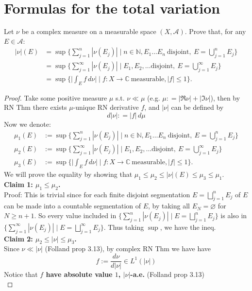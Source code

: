 \documentclass[lang=cn,11pt]{elegantbook}
\begin{document}
\section{Formulas for the total variation}
  Let $\nu$ be a complex measure on a measurable space $(X,\mathcal{A})$. Prove that, for any $E\in\mathcal{A}$:   \begin{align*}
    |\nu|(E)
    &=\sup\{\sum_{j=1}^n|\nu(E_j)|\mid n\in\mathbb{N}, E_1\dots E_n\ \text{disjoint},\ E=\bigcup_{j=1}^nE_j\}\\
    &=\sup\{\sum_{j=1}^\infty|\nu(E_j)|\mid E_1, E_2,\dots \text{disjoint},\ E=\bigcup_{j=1}^\infty E_j\}\\
    &=\sup\{\big|\int_E f\,d\nu\big|\mid f\colon X\to\mathbb{C}\ \text{measurable}, |f|\le 1\}.
  \end{align*}
\begin{proof}
Take some positive measure $\mu$ s.t.  $\nu \ll \mu$ (e.g. $\mu: =  |\Re \nu | + | \Im \nu |$), then by RN Thm there exists $\mu$-unique RN derivative $f$, and $|\nu|$ can be defined by \[
d |\nu|  : =  |f | \,d \mu
\]
Now we denote: \begin{align*}
    \mu_1(E) &:=\sup\{\sum_{j=1}^n|\nu(E_j)|\mid n\in\mathbb{N}, E_1\dots E_n\ \text{disjoint},\ E=\bigcup_{j=1}^nE_j\}\\
     \mu_2(E) &:=\sup\{\sum_{j=1}^\infty|\nu(E_j)|\mid E_1, E_2,\dots \text{disjoint},\ E=\bigcup_{j=1}^\infty E_j\}\\
    \mu_3(E) &:=\sup\{\big|\int_E f\,d\nu\big|\mid f\colon X\to\mathbb{C}\ \text{measurable}, |f|\le 1\}.
\end{align*}
We will prove the equality by showing that $\mu_1 \leq \mu_2 \leq |\nu|(E) \leq \mu_3  \leq \mu_1$.\\
\textbf{Claim 1: $\mu_1 \leq \mu_2$.}\\
Proof: This is trivial since for each finite disjoint segmentation $E=\bigsqcup_{j=1}^nE_j$ of $E$ can be made into a countable segmentation of $E$, by taking all $E_N = \varnothing$ for $N \geq n+1$. So every value included in $\{\sum_{j=1}^n|\nu(E_j)|\mid E=\bigsqcup_{j=1}^nE_j\}$ is also in $\{\sum_{j=1}^\infty|\nu(E_j)|\mid E=\bigsqcup_{j=1}^\infty E_j\}$. Thus taking $\sup$, we have the ineq.\\
\textbf{Claim 2: $\mu_2 \leq  | \nu | \leq \mu_3$.}\\
Since $\nu \ll |\nu|$ (Folland prop 3.13), by complex RN Thm we have have  $$f:=\frac{d \nu}{d|\nu|} \in L^1(|\nu|)$$
Notice that\textbf{ $f$ have absolute value $1$, $|\nu|$-a.e.} (Folland prop 3.13)\\

\end{proof}
\end{document}
